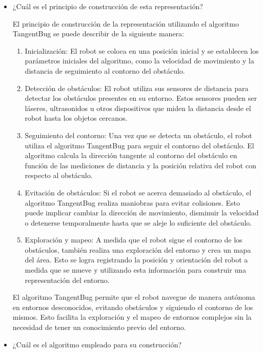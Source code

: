 \documentclass{article}
\begin{document}
\begin{itemize}
\item ¿Cuál es el principio de construcción de esta representación?

  El principio de construcción de la representación utilizando el algoritmo TangentBug se puede describir de la siguiente manera:

  \begin{enumerate}
  \item Inicialización: El robot se coloca en una posición inicial y se establecen los parámetros iniciales del algoritmo, como la velocidad de movimiento y la distancia de seguimiento al contorno del obstáculo.
  \item Detección de obstáculos: El robot utiliza sus sensores de distancia para detectar los obstáculos presentes en su entorno. Estos sensores pueden ser láseres, ultrasonidos u otros dispositivos que miden la distancia desde el robot hasta los objetos cercanos.
  \item Seguimiento del contorno: Una vez que se detecta un obstáculo, el robot utiliza el algoritmo TangentBug para seguir el contorno del obstáculo. El algoritmo calcula la dirección tangente al contorno del obstáculo en función de las mediciones de distancia y la posición relativa del robot con respecto al obstáculo.
  \item Evitación de obstáculos: Si el robot se acerca demasiado al obstáculo, el algoritmo TangentBug realiza maniobras para evitar colisiones. Esto puede implicar cambiar la dirección de movimiento, disminuir la velocidad o detenerse temporalmente hasta que se aleje lo suficiente del obstáculo.
  \item Exploración y mapeo: A medida que el robot sigue el contorno de los obstáculos, también realiza una exploración del entorno y crea un mapa del área. Esto se logra registrando la posición y orientación del robot a medida que se mueve y utilizando esta información para construir una representación del entorno.
  \end{enumerate}

  El algoritmo TangentBug permite que el robot navegue de manera autónoma en entornos desconocidos, evitando obstáculos y siguiendo el contorno de los mismos. Esto facilita la exploración y el mapeo de entornos complejos sin la necesidad de tener un conocimiento previo del entorno.
  
\item ¿Cuál es el algoritmo empleado para su construcción?


\end{itemize}
\end{document}
